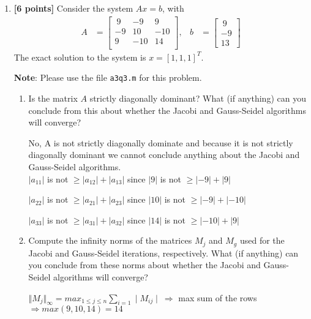 \documentclass{article}
\begin{document}
\begin{enumerate}
\begin{mdframed}[style=MyFrame]
\end{mdframed}

\newpage
\item {\bf[6 points]} Consider the system $Ax = b$, with 
\begin{align*}
A &= \begin{bmatrix}
 ~9     &-9     &9 \\
    -9     &10     &-10 \\
   9     &-10     &14 \\
\end{bmatrix},
&b &= \begin{bmatrix}~9 \\-9\\13 \end{bmatrix}
\end{align*}
The exact solution to the system is $x = [1, 1, 1]^T$.

{\bf Note}: Please use the file {\tt a3q3.m} for this problem.

\begin{enumerate}
\item Is the matrix $A$ strictly diagonally dominant? What (if anything) can you conclude from this about whether the Jacobi and Gauss-Seidel algorithms will converge?

\begin{mdframed}[style=MyFrame]
No, A is not strictly diagonally dominate and because it is not strictly diagonally dominant we cannot conclude anything about the Jacobi and Gauss-Seidel algorithms.\\

$|a_{11}| $ is not $\ge |a_{12}| + |a_{13}|$ since $|9|  $ is not $\ge |-9| + |9|$

$|a_{22}| $ is not $ \ge |a_{21}| + |a_{23}|$ since $|10|  $ is not $\ge |-9| + |-10|$

$|a_{33}| $ is not $ \ge |a_{31}| + |a_{32}|$ since $|14|  $ is not $\ge |-10| + |9|$
\end{mdframed}
\item Compute the infinity norms of the matrices $M_j$ and $M_g$ used for the Jacobi and Gauss-Seidel iterations, respectively. What (if anything) can you conclude from these norms about whether the Jacobi and Gauss-Seidel algorithms will converge?

\begin{mdframed}[style=MyFrame]
$\Vert M_j \Vert_{\infty} = max_{1 \leq j \leq n} \sum_{i=1} \mid M_{ij}\mid~ \Rightarrow$ max sum of the rows $\Rightarrow max(9,10,14)= 14$


\end{mdframed}
\end{enumerate}
\end{enumerate}
\end{document}
